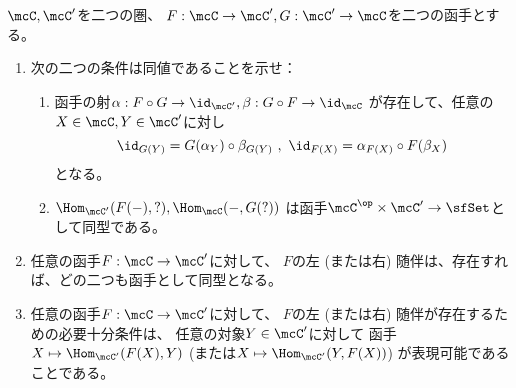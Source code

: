 \documentclass[uplatex,dvipdfmx]{jsarticle}
\begin{document}
\maketitle
\HeaderCommentA
\section{}
\fi

\begin{prob}\label{1.2}
  \(\mcC,\mcC'\)を二つの圏、
  \(F:\mcC\to \mcC', G:\mcC'\to \mcC\)を二つの函手とする。
  \begin{enumerate}
    \item \label{1.2.1}
    次の二つの条件は同値であることを示せ：
    \begin{enumerate}
      \item \label{1.2.1.1}
      函手の射\(\alpha:F\circ G \to \id_{\mcC'}, \beta:G\circ F \to \id_{\mcC}\)
      が存在して、任意の\(X\in \mcC, Y\in \mcC'\)に対し
      \[
      \id_{G(Y)} = G(\alpha_Y) \circ \beta_{G(Y)} \ , \
      \id_{F(X)} = \alpha_{F(X)} \circ F(\beta_X)
      \]
      となる。
      \item \label{1.2.1.2}
      \(\Hom_{\mcC'}(F(-),?),\Hom_{\mcC}(-,G(?))\)
      は函手\(\mcC^{\op}\times \mcC' \to \sfSet\)として同型である。
    \end{enumerate}
    \item \label{1.2.2}
    任意の函手\(F:\mcC\to \mcC'\)に対して、
    \(F\)の左 (または右) 随伴は、存在すれば、どの二つも函手として同型となる。
    \item \label{1.2.3}
    任意の函手\(F:\mcC\to \mcC'\)に対して、
    \(F\)の左 (または右) 随伴が存在するための必要十分条件は、
    任意の対象\(Y\in \mcC'\)に対して
    函手\(X\mapsto \Hom_{\mcC'}(F(X),Y)\)
    (または\(X\mapsto \Hom_{\mcC'}(Y,F(X))\))
    が表現可能であることである。
  \end{enumerate}
\end{prob}
\end{document}
